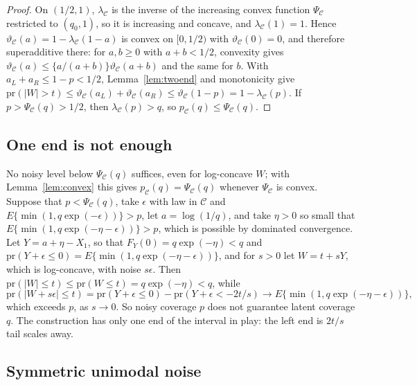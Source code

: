 \documentclass[12pt]{article}
\renewcommand{\_}{\usc\allowbreak}
\theoremstyle{definition}
\numberwithin{equation}{section}
\newcommand{\pr}{\mathrm{pr}}
\newcommand{\E}{\mathcal{C}}
\begin{document}
\begin{proof}
On $(1/2, 1)$, $\lambda_{\E}$ is the inverse of the increasing convex function $\Psi_{\E}$ restricted to $(q_0, 1)$, so it is increasing and concave, and $\lambda_{\E}(1) = 1$. Hence $\vartheta_{\E}(a) = 1 - \lambda_{\E}(1 - a)$ is convex on $[0, 1/2)$ with $\vartheta_{\E}(0) = 0$, and therefore superadditive there: for $a, b \ge 0$ with $a + b < 1/2$, convexity gives $\vartheta_{\E}(a) \le \{a/(a + b)\}\vartheta_{\E}(a + b)$ and the same for $b$. With $a_L + a_R \le 1 - p < 1/2$, Lemma~\ref{lem:twoend} and monotonicity give $\pr(|W| > t) \le \vartheta_{\E}(a_L) + \vartheta_{\E}(a_R) \le \vartheta_{\E}(1 - p) = 1 - \lambda_{\E}(p)$. If $p > \Psi_{\E}(q) > 1/2$, then $\lambda_{\E}(p) > q$, so $p_{\E}(q) \le \Psi_{\E}(q)$.
\end{proof}

\subsection{One end is not enough}\label{sec:s-oneend}

No noisy level below $\Psi_{\E}(q)$ suffices, even for log-concave $W$; with Lemma~\ref{lem:convex} this gives $p_{\E}(q) = \Psi_{\E}(q)$ whenever $\Psi_{\E}$ is convex. Suppose that $p < \Psi_{\E}(q)$, take $\epsilon$ with law in $\E$ and $E\{\min(1, q\exp(-\epsilon))\} > p$, let $a = \log(1/q)$, and take $\eta > 0$ so small that $E\{\min(1, q\exp(-\eta - \epsilon))\} > p$, which is possible by dominated convergence. Let $Y = a + \eta - X_1$, so that $F_Y(0) = q\exp(-\eta) < q$ and $\pr(Y + \epsilon \le 0) = E\{\min(1, q\exp(-\eta - \epsilon))\}$, and for $s > 0$ let $W = t + sY$, which is log-concave, with noise $s\epsilon$. Then $\pr(|W| \le t) \le \pr(W \le t) = q\exp(-\eta) < q$, while
\[
\pr(|W + s\epsilon| \le t) = \pr(Y + \epsilon \le 0) - \pr(Y + \epsilon < -2t/s) \to E\{\min(1, q\exp(-\eta - \epsilon))\},
\]
which exceeds $p$,
as $s \to 0$. So noisy coverage $p$ does not guarantee latent coverage $q$. The construction has only one end of the interval in play: the left end is $2t/s$ tail scales away.

\subsection{Symmetric unimodal noise}\label{sec:s-su}
\end{document}
